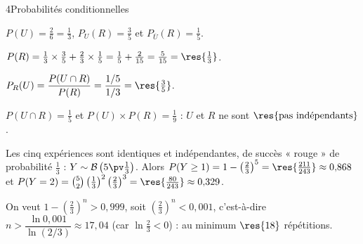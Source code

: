 

\begin{corrigeBac}{4}{Probabilités conditionnelles}
\begin{questions}
  \item $P(U)=\frac26=\frac13$, $P_U(R)=\frac35$ et $P_{\overline U}(R)=\frac15$.
\begin{center}
\end{center}
  \item $P(R)=\frac13\times\frac35+\frac23\times\frac15=\frac15+\frac2{15}=\frac5{15}=\res{\tfrac13}$. 
  \item $P_R(U)=\dfrac{P(U\cap R)}{P(R)}=\dfrac{1/5}{1/3}=\res{\tfrac35}$. 
  \item $P(U\cap R)=\frac15$ et $P(U)\times P(R)=\frac19$ : $U$ et $R$ ne sont $\res{\text{pas indépendants}}$. 
  \item Les cinq expériences sont identiques et indépendantes, de succès « rouge » de probabilité $\frac13$ :
    $Y\sim\mathcal{B}\left(5\pv\frac13\right)$. Alors $P(Y\geq1)=1-\left(\frac23\right)^{5}=\res{\tfrac{211}{243}}\approx0{,}868$ et
    $P(Y=2)=\binom52\left(\frac13\right)^{2}\left(\frac23\right)^{3}=\res{\tfrac{80}{243}}\approx0{,}329$. \pts{1 pt}
  \item On veut $1-\left(\frac23\right)^{n}>0{,}999$, soit $\left(\frac23\right)^{n}<0{,}001$, c'est-à-dire
    $n>\dfrac{\ln0{,}001}{\ln(2/3)}\approx17{,}04$ (car $\ln\frac23<0$) : au minimum $\res{18}$ répétitions. 
\end{questions}
\end{corrigeBac}

